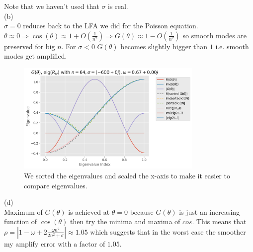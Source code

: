 \documentclass[a4paper,12pt]{article}
\begin{document}
Note that we haven't used that $\sigma$ is real. \\
(b) \\
$\sigma = 0$ reduces back to the LFA we did for the Poisson equation.
$\theta \approx 0 \Rightarrow \cos(\theta)
    \approx 1 + O \left(\frac{1}{n^{2}}\right) \Rightarrow G(\theta) \approx 1 - O \left(\frac{1}{n^{2}}\right)$
so smooth modes are preserved for big $n$. For $\sigma<0$ $G(\theta)$ becomes slightly bigger than $1$
i.e. smooth modes get amplified.\\
\begin{figure}[h!]
    \centering
    \includegraphics[width=0.8\textwidth]{../code/plts/eigenvalues_1DrealG.png}
    \caption{We sorted the eigenvalues and scaled the x-axis to make it easier to compare eigenvalues.}
    \label{fig:eig real1D G}
\end{figure}

(d)\\
Maximum of $G(\theta)$ is achieved at $\theta =0$ because $G(\theta)$ is just
an increasing function of $\cos(\theta)$ then try the minima and maxima of $cos$.
This means that
$\rho = |1-\omega + 2 \frac{\omega n^{2}}{2 n^{2} + \sigma}|  \approx 1.05 $
which suggests that in the worst case the smoother my amplify error with a factor of $1.05$.
\end{document}
